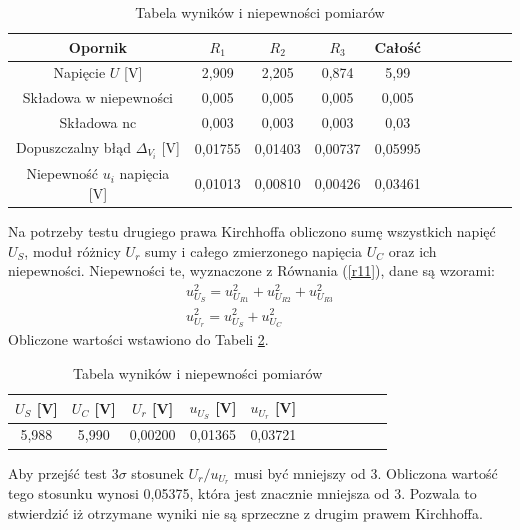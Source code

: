 \documentclass[10pt,a4paper]{article}
\begin{document}
  \begin{center}
 \begin{table}[h!]
 \centering
 \caption{Tabela wyników i niepewności pomiarów}
 \label{t6}
 \begin{tabular}{|c|c|c|c|c|c|c|c|c|c|c|}
 \hline
 Opornik&$R_{1}$& $R_{2}$&$R_{3}$ &Całość \\
 \hline
 Napięcie $U$ [V]& 2,909 &2,205&0,874&5,99 \\
 \hline 
 Składowa w niepewności&0,005&0,005&0,005&0,005\\
 \hline
 Składowa nc&0,003&0,003&0,003&0,03\\
 \hline
 Dopuszczalny błąd $\Delta_{V_{i}}$ [V]&0,01755&0,01403&0,00737&0,05995\\
 \hline
 Niepewność $u_{i}$ napięcia [V] &0,01013&0,00810&0,00426&0,03461\\
 \hline
 \end{tabular}
 \end{table}
 \end{center}
Na potrzeby testu drugiego prawa Kirchhoffa obliczono sumę wszystkich napięć $U_{S}$, moduł różnicy $U_{r}$ sumy i całego zmierzonego napięcia $U_{C}$ oraz ich niepewności. Niepewności te, wyznaczone z Równania (\ref{r11}), dane są wzorami:
 \begin{eqnarray}
u_{U_{S}}^{2}=u_{U_{R1}}^{2}+u_{U_{R2}}^{2}+u_{U_{R3}}^{2} \\
\label{r12}
u_{U_{r}}^2=u_{U_{S}}^2+u_{U_{C}}^2
\label{r13}
\end{eqnarray}
Obliczone wartości wstawiono do Tabeli \ref{t7}.
\begin{center}
\begin{table}[h!]
 \centering
 \caption{Tabela wyników i niepewności pomiarów}
 \label{t7}
 \begin{tabular}{|c|c|c|c|c|c|c|c|c|c|c|}
 \hline
 $U_{S}$ [V]&$U_{C}$ [V]& $U_{r}$ [V]&$u_{U_{S}}$ [V] &$u_{U_{r}}$ [V] \\
 \hline
 5,988&5,990&0,00200&0,01365&0,03721\\
 \hline
 \end{tabular}
 \end{table}
 \end{center}
Aby przejść test $3\sigma$ stosunek $U_{r}/u_{U_{r}}$ musi być mniejszy od $3$. Obliczona wartość tego stosunku wynosi 0,05375, która jest znacznie mniejsza od 3. Pozwala to stwierdzić iż otrzymane wyniki nie są sprzeczne z drugim prawem Kirchhoffa.
\end{document}
